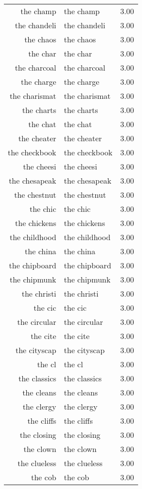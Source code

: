 \begin{table}[ht]
\begin{tabular}{rlr}
  the champ & the champ & 3.00 \\ 
  the chandeli & the chandeli & 3.00 \\ 
  the chaos & the chaos & 3.00 \\ 
  the char & the char & 3.00 \\ 
  the charcoal & the charcoal & 3.00 \\ 
  the charge & the charge & 3.00 \\ 
  the charismat & the charismat & 3.00 \\ 
  the charts & the charts & 3.00 \\ 
  the chat & the chat & 3.00 \\ 
  the cheater & the cheater & 3.00 \\ 
  the checkbook & the checkbook & 3.00 \\ 
  the cheesi & the cheesi & 3.00 \\ 
  the chesapeak & the chesapeak & 3.00 \\ 
  the chestnut & the chestnut & 3.00 \\ 
  the chic & the chic & 3.00 \\ 
  the chickens & the chickens & 3.00 \\ 
  the childhood & the childhood & 3.00 \\ 
  the china & the china & 3.00 \\ 
  the chipboard & the chipboard & 3.00 \\ 
  the chipmunk & the chipmunk & 3.00 \\ 
  the christi & the christi & 3.00 \\ 
  the cic & the cic & 3.00 \\ 
  the circular & the circular & 3.00 \\ 
  the cite & the cite & 3.00 \\ 
  the cityscap & the cityscap & 3.00 \\ 
  the cl & the cl & 3.00 \\ 
  the classics & the classics & 3.00 \\ 
  the cleans & the cleans & 3.00 \\ 
  the clergy & the clergy & 3.00 \\ 
  the cliffs & the cliffs & 3.00 \\ 
  the closing & the closing & 3.00 \\ 
  the clown & the clown & 3.00 \\ 
  the clueless & the clueless & 3.00 \\ 
  the cob & the cob & 3.00 \\ 

\end{tabular}
\end{table}
